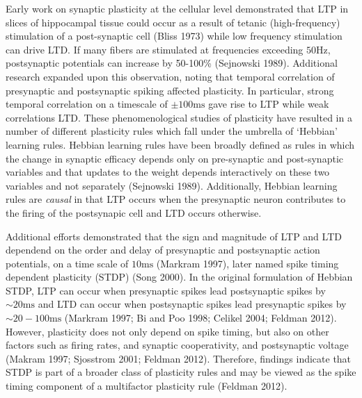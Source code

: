 \documentclass{ucetd}
\begin{document}
Early work on synaptic plasticity at the cellular level demonstrated that LTP in slices of hippocampal tissue could occur as a result of tetanic (high-frequency) stimulation of a post-synaptic cell (Bliss 1973) while low frequency stimulation can drive LTD. If many fibers are stimulated at frequencies exceeding $50\text{Hz}$, postsynaptic potentials can increase by 50-100\% (Sejnowski 1989). Additional research expanded upon this observation, noting that temporal correlation of presynaptic and postsynaptic spiking affected plasticity. In particular, strong temporal correlation on a timescale of $\pm 100 \text{ms}$ gave rise to LTP while weak correlations LTD. These phenomenological studies of plasticity have resulted in a number of different plasticity rules which fall under the umbrella of `Hebbian' learning rules. Hebbian learning rules have been broadly defined as rules in which the change in synaptic efficacy depends only on pre-synaptic and post-synaptic variables and that updates to the weight depends interactively on these two variables and not separately (Sejnowski 1989).  Additionally, Hebbian learning rules are \emph{causal} in that LTP occurs when the presynaptic neuron contributes to the firing of the postsynapic cell and LTD occurs otherwise.

Additional efforts demonstrated that the sign and magnitude of LTP and LTD dependend on the order and delay of presynaptic and postsynaptic action potentials, on a time scale of $10\text{ms}$ (Markram 1997), later named spike timing dependent plasticity (STDP) (Song 2000). In the original formulation of Hebbian STDP, LTP can occur when presynaptic spikes lead postsynaptic spikes by $\sim 20\mathrm{ms}$ and LTD can occur when postsynaptic spikes lead presynaptic spikes by $\sim 20-100\mathrm{ms}$ (Markram 1997; Bi and Poo 1998; Celikel 2004; Feldman 2012). However, plasticity does not only depend on spike timing, but also on other factors such as firing rates, and synaptic cooperativity, and postsynaptic voltage (Makram 1997; Sjosstrom 2001; Feldman 2012). Therefore, findings indicate that STDP is part of a broader class of plasticity rules and may be viewed as the spike timing component of a multifactor plasticity rule (Feldman 2012).
\end{document}
